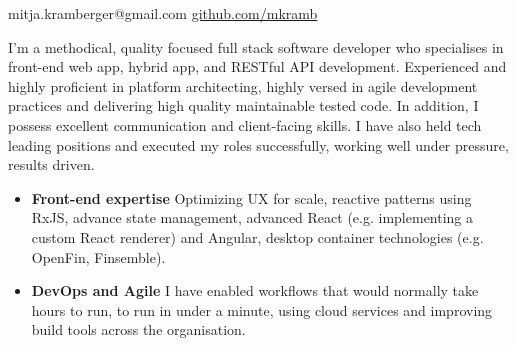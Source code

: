 \documentclass[10pt,a4paper]{article}
\begin{document}
\sloppy  %


\nobreakvspace{0.3em}  %

\noindent
mitja.kramberger@gmail.com\sbull
\href{http://github.com/mkramb}{github.com/mkramb}


\spacedhrule{0.9em}{-0.4em}  %
\vspace{-0em}  %

\noindent I'm a methodical, quality­ focused full stack software developer who specialises in front-end web app, hybrid app, and RESTful API development. 
\noindent Experienced and highly proficient in platform architecting, highly versed in agile development practices and delivering high quality maintainable tested code. 
\noindent In addition, I possess excellent communication and client-facing skills. I have also held tech leading positions and executed my roles successfully, working well under pressure, results driven.

\spacedhrule{1.5em}{-0.4em}



\begin{indentsection}
\item
\begin{itemize}[leftmargin=0cm]
    \item \textbf{Front-end expertise} Optimizing UX for scale, reactive patterns using RxJS, advance state management, advanced React (e.g. implementing a custom React renderer) and Angular, desktop container technologies (e.g. OpenFin, Finsemble).
    \item \textbf{DevOps and Agile} I have enabled workflows that would normally take hours to run, to run in under a minute, using cloud services and improving build tools across the organisation.
\end{itemize}
\end{indentsection}

\spacedhrule{0.9em}{-0.4em} 


\end{document}
